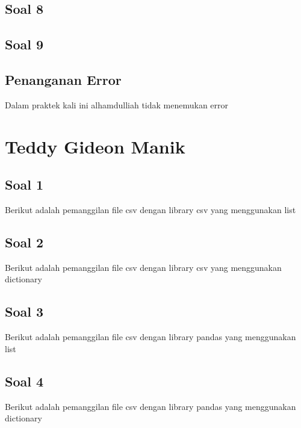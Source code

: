 \subsection{Soal 8}


\subsection{Soal 9}


\subsection{Penanganan Error}
Dalam praktek kali ini alhamdulliah tidak menemukan error


\section{Teddy Gideon Manik}
\subsection{Soal 1}
Berikut adalah pemanggilan file csv dengan library csv yang menggunakan list


\subsection{Soal 2}
Berikut adalah pemanggilan file csv dengan library csv yang menggunakan dictionary


\subsection{Soal 3}
Berikut adalah pemanggilan file csv dengan library pandas yang menggunakan list


\subsection{Soal 4}
Berikut adalah pemanggilan file csv dengan library pandas yang menggunakan dictionary


